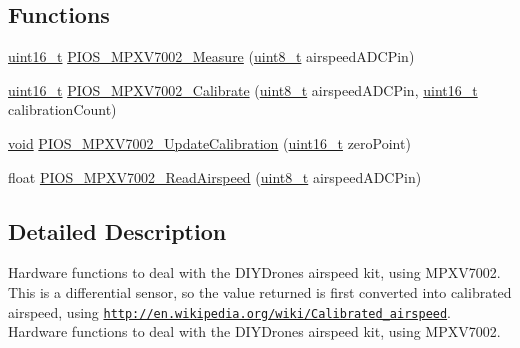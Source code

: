 \subsection*{Functions}
\begin{DoxyCompactItemize}
\item 
\hyperlink{stdint_8h_a273cf69d639a59973b6019625df33e30}{uint16\-\_\-t} \hyperlink{group___p_i_o_s___m_p_x_v7002_ga705251be57f475b27e6b587ab5bc9e92}{P\-I\-O\-S\-\_\-\-M\-P\-X\-V7002\-\_\-\-Measure} (\hyperlink{stdint_8h_aba7bc1797add20fe3efdf37ced1182c5}{uint8\-\_\-t} airspeed\-A\-D\-C\-Pin)
\item 
\hyperlink{stdint_8h_a273cf69d639a59973b6019625df33e30}{uint16\-\_\-t} \hyperlink{group___p_i_o_s___m_p_x_v7002_ga520aa61ca1d841e66d5e882a03d36d53}{P\-I\-O\-S\-\_\-\-M\-P\-X\-V7002\-\_\-\-Calibrate} (\hyperlink{stdint_8h_aba7bc1797add20fe3efdf37ced1182c5}{uint8\-\_\-t} airspeed\-A\-D\-C\-Pin, \hyperlink{stdint_8h_a273cf69d639a59973b6019625df33e30}{uint16\-\_\-t} calibration\-Count)
\item 
\hyperlink{group___n_a_m_e_ga18028b8badbf1ea7e704ccac3c488e82}{void} \hyperlink{group___p_i_o_s___m_p_x_v7002_ga41b25e0b6038d2a270e131d793dfcbfa}{P\-I\-O\-S\-\_\-\-M\-P\-X\-V7002\-\_\-\-Update\-Calibration} (\hyperlink{stdint_8h_a273cf69d639a59973b6019625df33e30}{uint16\-\_\-t} zero\-Point)
\item 
float \hyperlink{group___p_i_o_s___m_p_x_v7002_ga4b633792da46f4b0fe82dcd3d17f416c}{P\-I\-O\-S\-\_\-\-M\-P\-X\-V7002\-\_\-\-Read\-Airspeed} (\hyperlink{stdint_8h_aba7bc1797add20fe3efdf37ced1182c5}{uint8\-\_\-t} airspeed\-A\-D\-C\-Pin)
\end{DoxyCompactItemize}


\subsection{Detailed Description}
Hardware functions to deal with the D\-I\-Y\-Drones airspeed kit, using M\-P\-X\-V7002. This is a differential sensor, so the value returned is first converted into calibrated airspeed, using \href{http://en.wikipedia.org/wiki/Calibrated_airspeed}{\tt http\-://en.\-wikipedia.\-org/wiki/\-Calibrated\-\_\-airspeed}. Hardware functions to deal with the D\-I\-Y\-Drones airspeed kit, using M\-P\-X\-V7002.

